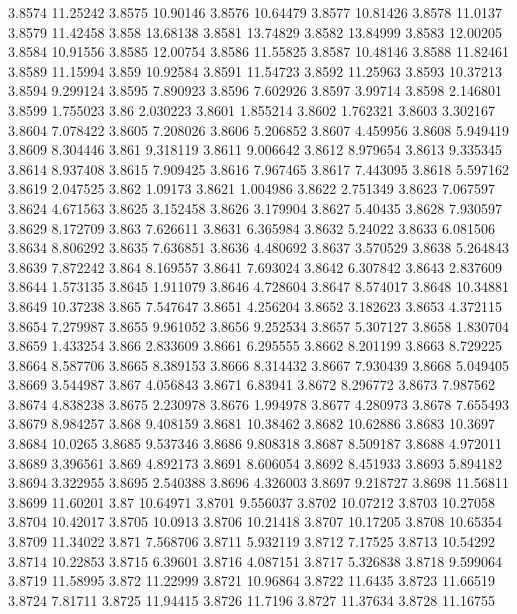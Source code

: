 3.8574  11.25242
3.8575  10.90146
3.8576  10.64479
3.8577  10.81426
3.8578  11.0137
3.8579  11.42458
3.858  13.68138
3.8581  13.74829
3.8582  13.84999
3.8583  12.00205
3.8584  10.91556
3.8585  12.00754
3.8586  11.55825
3.8587  10.48146
3.8588  11.82461
3.8589  11.15994
3.859  10.92584
3.8591  11.54723
3.8592  11.25963
3.8593  10.37213
3.8594  9.299124
3.8595  7.890923
3.8596  7.602926
3.8597  3.99714
3.8598  2.146801
3.8599  1.755023
3.86  2.030223
3.8601  1.855214
3.8602  1.762321
3.8603  3.302167
3.8604  7.078422
3.8605  7.208026
3.8606  5.206852
3.8607  4.459956
3.8608  5.949419
3.8609  8.304446
3.861  9.318119
3.8611  9.006642
3.8612  8.979654
3.8613  9.335345
3.8614  8.937408
3.8615  7.909425
3.8616  7.967465
3.8617  7.443095
3.8618  5.597162
3.8619  2.047525
3.862  1.09173
3.8621  1.004986
3.8622  2.751349
3.8623  7.067597
3.8624  4.671563
3.8625  3.152458
3.8626  3.179904
3.8627  5.40435
3.8628  7.930597
3.8629  8.172709
3.863  7.626611
3.8631  6.365984
3.8632  5.24022
3.8633  6.081506
3.8634  8.806292
3.8635  7.636851
3.8636  4.480692
3.8637  3.570529
3.8638  5.264843
3.8639  7.872242
3.864  8.169557
3.8641  7.693024
3.8642  6.307842
3.8643  2.837609
3.8644  1.573135
3.8645  1.911079
3.8646  4.728604
3.8647  8.574017
3.8648  10.34881
3.8649  10.37238
3.865  7.547647
3.8651  4.256204
3.8652  3.182623
3.8653  4.372115
3.8654  7.279987
3.8655  9.961052
3.8656  9.252534
3.8657  5.307127
3.8658  1.830704
3.8659  1.433254
3.866  2.833609
3.8661  6.295555
3.8662  8.201199
3.8663  8.729225
3.8664  8.587706
3.8665  8.389153
3.8666  8.314432
3.8667  7.930439
3.8668  5.049405
3.8669  3.544987
3.867  4.056843
3.8671  6.83941
3.8672  8.296772
3.8673  7.987562
3.8674  4.838238
3.8675  2.230978
3.8676  1.994978
3.8677  4.280973
3.8678  7.655493
3.8679  8.984257
3.868  9.408159
3.8681  10.38462
3.8682  10.62886
3.8683  10.3697
3.8684  10.0265
3.8685  9.537346
3.8686  9.808318
3.8687  8.509187
3.8688  4.972011
3.8689  3.396561
3.869  4.892173
3.8691  8.606054
3.8692  8.451933
3.8693  5.894182
3.8694  3.322955
3.8695  2.540388
3.8696  4.326003
3.8697  9.218727
3.8698  11.56811
3.8699  11.60201
3.87  10.64971
3.8701  9.556037
3.8702  10.07212
3.8703  10.27058
3.8704  10.42017
3.8705  10.0913
3.8706  10.21418
3.8707  10.17205
3.8708  10.65354
3.8709  11.34022
3.871  7.568706
3.8711  5.932119
3.8712  7.17525
3.8713  10.54292
3.8714  10.22853
3.8715  6.39601
3.8716  4.087151
3.8717  5.326838
3.8718  9.599064
3.8719  11.58995
3.872  11.22999
3.8721  10.96864
3.8722  11.6435
3.8723  11.66519
3.8724  7.81711
3.8725  11.94415
3.8726  11.7196
3.8727  11.37634
3.8728  11.16755
